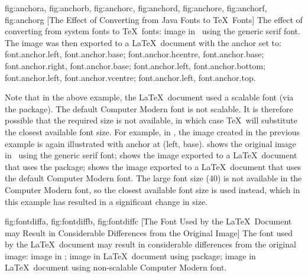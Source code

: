 {
  {fig:anchora}{}{},
  {fig:anchorb}{}{},
  {fig:anchorc}{}{},
  {fig:anchord}{}{},
  {fig:anchore}{}{},
  {fig:anchorf}{}{},
  {fig:anchorg}{}{}
}
[The Effect of Converting from Java Fonts to \TeX\ Fonts]
{The effect of converting from system fonts to \TeX\ fonts:
 image in \FlowframTk\ using the generic serif font. The
image was then exported to a \LaTeX\ document with the anchor
set to:
 \gls{font.anchor.left}, \gls{font.anchor.base};
 \gls{font.anchor.hcentre}, \gls{font.anchor.base};
 \gls{font.anchor.right}, \gls{font.anchor.base};
 \gls{font.anchor.left}, \gls{font.anchor.bottom};
 \gls{font.anchor.left}, \gls{font.anchor.vcentre};
 \gls{font.anchor.left}, \gls{font.anchor.top}.}

Note that in the above example, the \LaTeX\ document used a
scalable font (via the  package). The default
Computer Modern font is not scalable. It is therefore possible that
the required size is not available, in which case \TeX\ will
substitute the closest available font size. For example, in
, the image created in the previous
example is again illustrated with anchor at (left, base).
 shows the original image in
\FlowframTk\ using the generic serif font;
 shows the image exported to a \LaTeX\
document that uses the  package;
 shows the image exported to a
\LaTeX\ document that uses the default Computer Modern font. The
large font size (40) is not available in the Computer Modern
font, so the closest available font size is used instead, which in
this example has resulted in a significant change in size.

{
  {fig:fontdiffa}{}{},
  {fig:fontdiffb}{}{},
  {fig:fontdiffc}{}{}
}
[The Font Used by the \LaTeX\ Document may Result in
Considerable Differences from the Original Image]
{The font used by the \LaTeX\ document may result in considerable differences from the
original image:
 image in \FlowframTk;
 image in \LaTeX\ document using  package;
\subfigref{fig:fontdiffc} image
in \LaTeX\ document using non-scalable Computer Modern font.}

